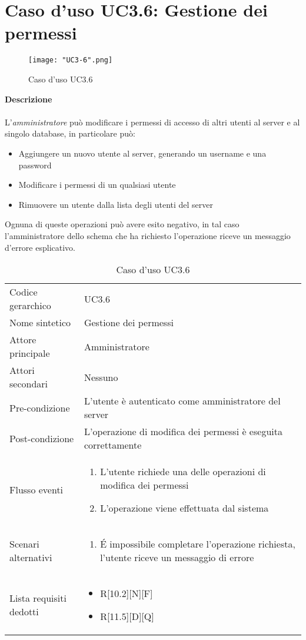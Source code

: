 \documentclass[a4paper]{report}
\begin{document}
	 \section{Caso d'uso UC3.6: Gestione dei permessi}
	 	\begin{figure}[H]
			\centering
			\texttt{[image: "UC3-6".png]}
			\caption{Caso d'uso UC3.6}
		\end{figure}
	 \textbf{Descrizione} \\ \\
	 L'\emph{amministratore} può modificare i permessi di accesso di altri utenti al server e al singolo
	  database, in particolare può:
	 \begin{itemize}
	 	\item Aggiungere un nuovo utente al server, generando un username e una password
	 	\item Modificare i permessi di un qualsiasi utente
	 	\item Rimuovere un utente dalla lista degli utenti del server
	 \end{itemize}
	 Ognuna di queste operazioni può avere esito negativo, in tal caso l'amministratore dello schema che ha
	 richiesto l'operazione riceve un messaggio d'errore esplicativo.
		\begin{table}[H]
		\begin{tabularx}{\textwidth}{X | X}\toprule
			\rowcolor{orange!65}Codice gerarchico & UC3.6 \\
			Nome sintetico & Gestione dei permessi \\
			\rowcolor{orange!65}Attore principale & Amministratore\\
			Attori secondari & Nessuno \\
			\rowcolor{orange!65}Pre-condizione & L'utente è autenticato come amministratore del server\\
			Post-condizione & L'operazione di modifica dei permessi è eseguita correttamente \\
			\rowcolor{orange!65}Flusso eventi & \begin{enumerate}
			\item L'utente richiede una delle operazioni di modifica dei permessi
			\item L'operazione viene effettuata dal sistema
			\end{enumerate} \\
			Scenari alternativi & \begin{enumerate}
			\item \'E impossibile completare l'operazione richiesta, l'utente riceve un messaggio di errore
			\end{enumerate} \\
			\rowcolor{orange!65}Lista requisiti dedotti & \begin{itemize}
				\item R[10.2][N][F]
				\item R[11.5][D][Q]
				\end{itemize} \\
			\bottomrule
		\end{tabularx}
		\caption{Caso d'uso UC3.6}
	 \end{table}
\end{document}
